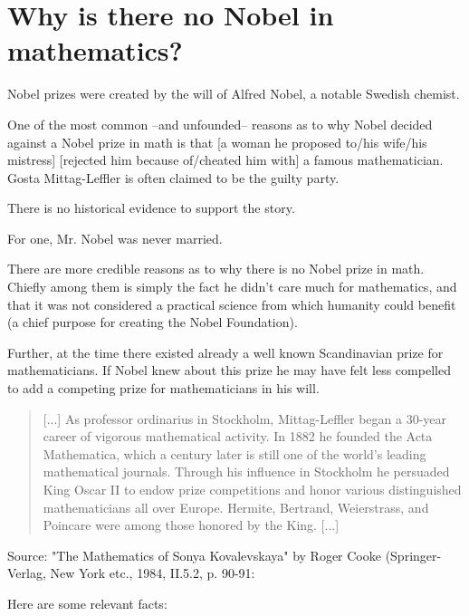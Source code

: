\section{Why is there no Nobel in mathematics? }

    Nobel prizes were created by the will of Alfred Nobel, a notable
    Swedish chemist.

    One of the most common --and unfounded-- reasons as to why Nobel
    decided against a Nobel prize in math is that [a woman he proposed
    to/his wife/his mistress] [rejected him because of/cheated him
    with] a famous mathematician. Gosta Mittag-Leffler is often claimed
    to be the guilty party.

    There is no historical evidence to support the story.

    For one, Mr. Nobel was never married.

    There are more credible reasons as to why there is no Nobel prize
    in math. Chiefly among them is simply the fact he didn't care much
    for mathematics, and that it was not considered a practical
    science from which humanity could benefit (a chief purpose
    for creating the Nobel Foundation).

    Further, at the time there existed already a well known
    Scandinavian prize for mathematicians. If Nobel knew about
    this prize he may have felt less compelled to add a competing
    prize for mathematicians in his will.

    \begin{quote}
[...] As professor ordinarius in Stockholm, Mittag-Leffler began a 30-year
career of vigorous mathematical activity. In 1882 he founded the Acta
Mathematica, which a century later is still one of the world's leading
mathematical journals. Through his influence in Stockholm he persuaded
King Oscar II to endow prize competitions and honor various distinguished
mathematicians all over Europe. Hermite, Bertrand, Weierstrass, and
Poincare were among those honored by the King. [...]
\end{quote}
Source: "The Mathematics of Sonya Kovalevskaya" by Roger
Cooke (Springer-Verlag, New York etc., 1984, II.5.2, p. 90-91:



    Here are some relevant facts:

